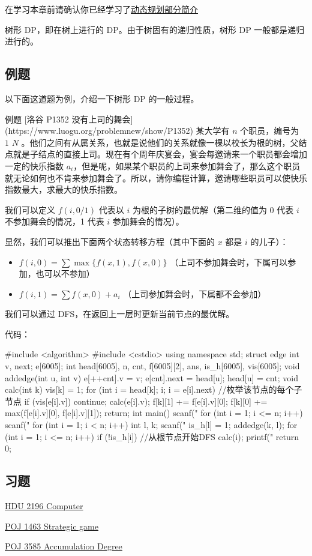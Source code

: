 
在学习本章前请确认你已经学习了\href{/dp}{动态规划部分简介}

树形 DP，即在树上进行的 DP。由于树固有的递归性质，树形 DP 一般都是递归进行的。

\subsection{例题}

以下面这道题为例，介绍一下树形 DP 的一般过程。

\begin{NOTE}{ 例题 [洛谷 P1352 没有上司的舞会](https://www.luogu.org/problemnew/show/P1352)}{}
某大学有 $n$ 个职员，编号为 $1\text{~} N$ 。他们之间有从属关系，也就是说他们的关系就像一棵以校长为根的树，父结点就是子结点的直接上司。现在有个周年庆宴会，宴会每邀请来一个职员都会增加一定的快乐指数 $a_i$，但是呢，如果某个职员的上司来参加舞会了，那么这个职员就无论如何也不肯来参加舞会了。所以，请你编程计算，邀请哪些职员可以使快乐指数最大，求最大的快乐指数。
\end{NOTE}


我们可以定义 $f(i,0/1)$ 代表以 $i$ 为根的子树的最优解（第二维的值为 0 代表 $i$ 不参加舞会的情况，1 代表 $i$ 参加舞会的情况）。

显然，我们可以推出下面两个状态转移方程（其中下面的 $x$ 都是 $i$ 的儿子）：

\begin{itemize}
\item $f(i,0) = \sum\max \{f(x,1),f(x,0)\}$ （上司不参加舞会时，下属可以参加，也可以不参加）
\item $f(i,1) = \sum{f(x,0)} + a_i$ （上司参加舞会时，下属都不会参加）
\end{itemize}

我们可以通过 DFS，在返回上一层时更新当前节点的最优解。

代码：

\begin{cppcode}
#include <algorithm>
#include <cstdio>
using namespace std;
struct edge {
  int v, next;
} e[6005];
int head[6005], n, cnt, f[6005][2], ans, is_h[6005], vis[6005];
void addedge(int u, int v) {
  e[++cnt].v = v;
  e[cnt].next = head[u];
  head[u] = cnt;
}
void calc(int k) {
  vis[k] = 1;
  for (int i = head[k]; i; i = e[i].next)  //枚举该节点的每个子节点
  {
    if (vis[e[i].v]) continue;
    calc(e[i].v);
    f[k][1] += f[e[i].v][0];
    f[k][0] += max(f[e[i].v][0], f[e[i].v][1]);
  }
  return;
}
int main() {
  scanf("%
  for (int i = 1; i <= n; i++) scanf("%
  for (int i = 1; i < n; i++) {
    int l, k;
    scanf("%
    is_h[l] = 1;
    addedge(k, l);
  }
  for (int i = 1; i <= n; i++)
    if (!is_h[i])  //从根节点开始DFS
    {
      calc(i);
      printf("%
      return 0;
    }
}
\end{cppcode}

\subsection{习题}

\href{http://acm.hdu.edu.cn/showproblem.php?pid=2196}{HDU 2196 Computer}

\href{http://poj.org/problem?id=1463}{POJ 1463 Strategic game}

\href{http://poj.org/problem?id=3585}{POJ 3585 Accumulation Degree}
